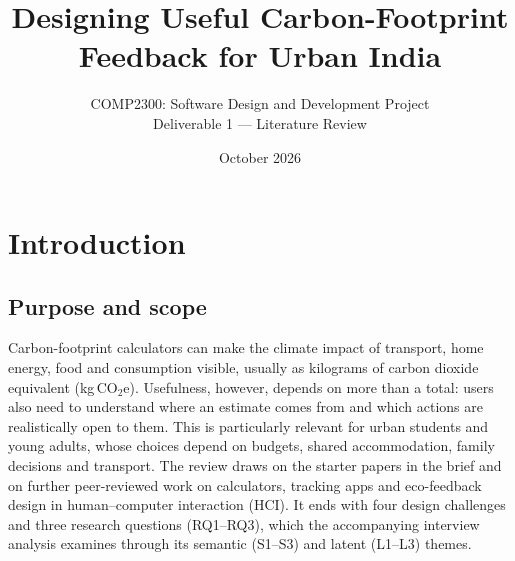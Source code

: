 \documentclass[10pt,a4paper,twocolumn]{article}
\title{\vspace{-1.25em}\Large\bfseries Designing Useful Carbon-Footprint Feedback for Urban India}
\author{\normalsize COMP2300: Software Design and Development Project\\[-1pt]
\small Deliverable 1 --- Literature Review}
\date{\small October 2026}
\begin{document}

\section{Introduction}
\subsection{Purpose and scope}
Carbon-footprint calculators can make the climate impact of transport, home energy, food and consumption visible, usually as kilograms of carbon dioxide equivalent (kg\,CO$_2$e). Usefulness, however, depends on more than a total: users also need to understand where an estimate comes from and which actions are realistically open to them. This is particularly relevant for urban students and young adults, whose choices depend on budgets, shared accommodation, family decisions and transport. The review draws on the starter papers in the brief and on further peer-reviewed work on calculators, tracking apps and eco-feedback design in human--computer interaction (HCI). It ends with four design challenges and three research questions (RQ1--RQ3), which the accompanying interview analysis examines through its semantic (S1--S3) and latent (L1--L3) themes.
\end{document}
